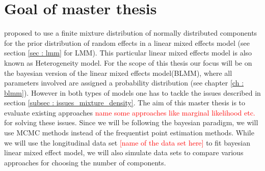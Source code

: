 \section{Goal of master thesis}
\label{sec : goal}
\citet*{verbeke_linear_1996} proposed to use a finite mixture distribution of normally distributed components for the prior distribution of random effects in a linear mixed effects model (see section \ref{sec : lmm} for LMM). This particular linear mixed effects model is also known as Heterogeneity model. For the scope of this thesis our focus will be on the bayesian version of the linear mixed effects model(BLMM), where all parameters involved are assigned a probability distribution (see chapter \ref{ch : blmm}). However in both types of models one has to tackle the issues described in section \ref{subsec : issues_mixture_density}. The aim of this master thesis is to evaluate existing approaches \textcolor{red}{name some approaches like marginal likelihood etc.} for solving these issues. Since we will be following the bayesian paradigm, we will use MCMC methods instead of the frequentist point estimation methods. While we will use the longitudinal data set \textcolor{red}{[name of the data set here]} to fit bayesian linear mixed effect model, we will also simulate data sets to compare various approaches for choosing the number of components.